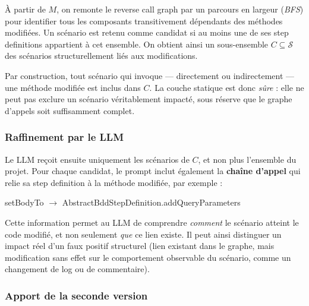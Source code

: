 \documentclass[12pt,a4paper]{article}
\begin{document}
À partir de $M$, on remonte le reverse call graph par un parcours en
largeur (\emph{BFS}) pour identifier tous les composants transitivement
dépendants des méthodes modifiées. Un scénario est retenu comme candidat
si au moins une de ses step definitions appartient à cet ensemble. On
obtient ainsi un sous-ensemble $C \subseteq \mathcal{S}$ des scénarios
structurellement liés aux modifications.

\begin{remarque}
  Par construction, tout scénario qui invoque --- directement ou
  indirectement --- une méthode modifiée est inclus dans $C$. La couche
  statique est donc \emph{sûre} : elle ne peut pas exclure un scénario
  véritablement impacté, sous réserve que le graphe d'appels soit
  suffisamment complet.
\end{remarque}

\subsubsection{Raffinement par le LLM}

Le LLM reçoit ensuite uniquement les scénarios de $C$, et non plus
l'ensemble du projet. Pour chaque candidat, le prompt inclut également
la \textbf{chaîne d'appel} qui relie sa step definition à la méthode
modifiée, par exemple :

\begin{center}
\ttfamily\small
setBodyTo $\to$ AbstractBddStepDefinition.addQueryParameters
\end{center}

Cette information permet au LLM de comprendre \emph{comment} le scénario
atteint le code modifié, et non seulement \emph{que} ce lien existe. Il
peut ainsi distinguer un impact réel d'un faux positif structurel (lien
existant dans le graphe, mais modification sans effet sur le comportement
observable du scénario, comme un changement de log ou de commentaire).

\subsubsection{Apport de la seconde version}
\end{document}
